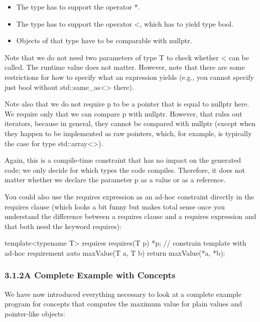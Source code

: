 \begin{itemize}
\item
The type has to support the operator *.

\item
The type has to support the operator <, which has to yield type bool.

\item
Objects of that type have to be comparable with nullptr.
\end{itemize}

Note that we do not need two parameters of type T to check whether < can be called. The runtime value does not matter. However, note that there are some restrictions for how to specify what an expression yields (e.g., you cannot specify just bool without std::same\_as<> there).

Note also that we do not require p to be a pointer that is equal to nullptr here. We require only that we can compare p with nullptr. However, that rules out iterators, because in general, they cannot be compared with nullptr (except when they happen to be implemented as raw pointers, which, for example, is typically the case for type std::array<>).

Again, this is a compile-time constraint that has no impact on the generated code; we only decide for which types the code compiles. Therefore, it does not matter whether we declare the parameter p as a value or as a reference.

You could also use the requires expression as an ad-hoc constraint directly in the requires clause (which looks a bit funny but makes total sense once you understand the difference between a requires clause and a requires expression and that both need the keyword requires):

\begin{cpp}
template<typename T>
requires requires(T p) { *p; } // constrain template with ad-hoc requirement
auto maxValue(T a, T b)
{
	return maxValue(*a, *b);
}
\end{cpp}

\subsubsection*{ 3.1.2\hspace{0.2cm}A Complete Example with Concepts}

We have now introduced everything necessary to look at a complete example program for concepts that computes the maximum value for plain values and pointer-like objects:

